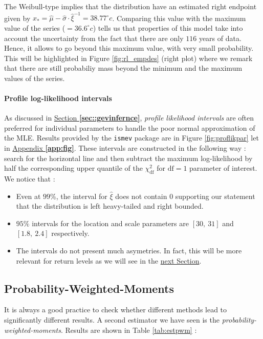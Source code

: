 The Weibull-type implies that the distribution have an estimated right endpoint given by $\hat{x}_*=\hat{\mu}-\hat{\sigma}\cdot\hat{\xi}^{-1}=38.77^{\circ}c$. Comparing this value with the maximum value of the series ($=36.6^{\circ}c$) tells us that properties of this model take into account the uncertainty from the fact that there are only $116$ years of data. Hence, it allows to go beyond this maximum value, with very small probability. This will be highlighted in Figure \ref{fig:rl_empdes} (right plot) where we remark that there are still probabiliy mass beyond the minimum and the maximum values of the series.

\paragraph*{Profile log-likelihood intervals} 
As discussed in \hyperref[sec::gevinfernce]{Section \textbf{\ref{sec::gevinfernce}}}, \emph{profile likelihood intervals} are often preferred for individual parameters to handle the poor normal approximation of the MLE. Results provided by the \texttt{ismev} package are in Figure \ref{fig:proflikpar} let in \hyperref[app:fig]{Appendix \textbf{\ref{app:fig}}}.
These intervals are constructed in the following way : search for the horizontal line and then subtract the maximum log-likelihood by half the corresponding upper quantile of the $\chi^2_{\text{df}}$ for $\text{df}=1$ parameter of interest. We notice that :
\begin{itemize}
	\item Even at $99\%$, the interval for $\hat{\xi}$ does not contain 0 supporting our statement that the distribution is left heavy-tailed and right bounded.
	
	\item $95\%$ intervals for the location and scale parameters are $[30,\ 31]$ and $[1.8, \ 2.4]$ respectively.
	
	\item The intervals do not present much asymetries. In fact, this will be more relevant for return levels as we will see in the \hyperref[sec:rlemp]{next Section}.
\end{itemize}


\subsection*{Probability-Weighted-Moments}

It is always a good practice to check whether different methods lead to significantly different results.
A second estimator we have seen is the \emph{probability-weighted-moments}. Results are shown in Table \ref{tab:estpwm} :

